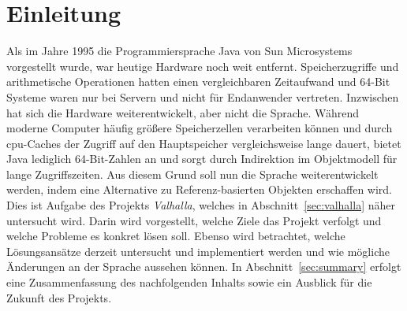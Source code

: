 \section{Einleitung}\label{sec:introduction}

Als im Jahre 1995 die Programmiersprache Java von Sun Microsystems vorgestellt wurde, war heutige Hardware noch weit entfernt.
Speicherzugriffe und arithmetische Operationen hatten einen vergleichbaren Zeitaufwand und 64-Bit Systeme waren nur bei Servern und nicht für Endanwender vertreten.
Inzwischen hat sich die Hardware weiterentwickelt, aber nicht die Sprache.
Während moderne Computer häufig größere Speicherzellen verarbeiten können und durch \ac{cpu}-Caches der Zugriff auf den Hauptspeicher vergleichsweise lange dauert, bietet Java lediglich 64-Bit-Zahlen an und sorgt durch Indirektion im Objektmodell für lange Zugriffszeiten.
Aus diesem Grund soll nun die Sprache weiterentwickelt werden, indem eine Alternative zu Referenz-basierten Objekten erschaffen wird.
Dies ist Aufgabe des Projekts \emph{Valhalla}, welches in Abschnitt~\ref{sec:valhalla} näher untersucht wird.
Darin wird vorgestellt, welche Ziele das Projekt verfolgt und welche Probleme es konkret lösen soll.
Ebenso wird betrachtet, welche Lösungsansätze derzeit untersucht und implementiert werden und wie mögliche Änderungen an der Sprache aussehen können.
In Abschnitt~\ref{sec:summary} erfolgt eine Zusammenfassung des nachfolgenden Inhalts sowie ein Ausblick für die Zukunft des Projekts.

